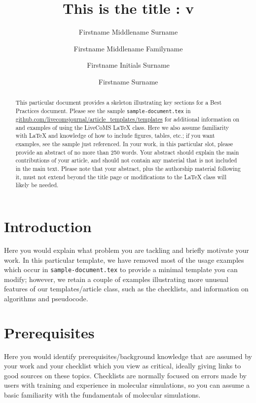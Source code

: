 \documentclass[9pt,bestpractices]{livecoms}
\title{This is the title : v\versionnumber}
\author[1*]{Firstname Middlename Surname}
\author[1,2\authfn{1}\authfn{3}]{Firstname Middlename Familyname}
\author[2\authfn{1}\authfn{4}]{Firstname Initials Surname}
\author[2*]{Firstname Surname}
\affil[1]{Institution 1}
\affil[2]{Institution 2}
\begin{document}
\begin{frontmatter}
\maketitle

\begin{abstract}
This particular document provides a skeleton illustrating key sections for a Best Practices document. Please see the sample \texttt{sample-document.tex} in \url{github.com/livecomsjournal/article_templates/templates} for additional information on and examples of using the LiveCoMS LaTeX class.
Here we also assume familiarity with LaTeX and knowledge of how to include figures, tables, etc.; if you want examples, see the sample just referenced.
In your work, in this particular slot, please provide an abstract of no more than 250 words.
Your abstract should explain the main contributions of your article, and should not contain any material that is not included in the main text.
Please note that your abstract, plus the authorship material following it, must not extend beyond the title page or modifications to the LaTeX class will likely be needed.
\end{abstract}

\end{frontmatter}




\section{Introduction}

Here you would explain what problem you are tackling and briefly motivate your work. In this particular template, we have removed most of the usage examples which occur in \texttt{sample-document.tex} to provide a minimal template you can modify; however, we retain a couple of examples illustrating more unusual features of our templates/article class, such as the checklists, and information on algorithms and pseudocode.

\section{Prerequisites}

Here you would identify prerequisites/background knowledge that are assumed by your work and your checklist which you view as critical, ideally giving links to good sources on these topics.
Checklists are normally focused on errors made by users with training and experience in molecular simulations, so you can assume a basic familiarity with the fundamentals of molecular simulations.
\end{document}
